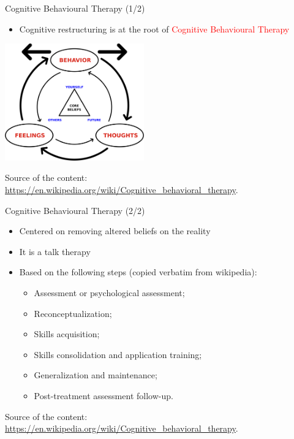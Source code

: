 \documentclass{beamer}
\begin{document}
\begin{frame}
{\centerline{Cognitive Behavioural Therapy (1/2)}}

\begin{itemize}
\item Cognitive restructuring is at the root of \textcolor{red}{Cognitive Behavioural Therapy}
\end{itemize} 

\begin{center}
 \includegraphics[width=6cm]{P2023.AIBCCSS.Change/Cognitive_behavioral_therapy.png}
 
 \end{center}
 
 \begin{center}
\tiny
Source of the content: \url{https://en.wikipedia.org/wiki/Cognitive_behavioral_therapy}.
\end{center}


\end{frame}

\begin{frame}
{\centerline{Cognitive Behavioural Therapy (2/2)}}

\begin{itemize}
\item Centered on removing altered beliefs on the reality
\item It is a talk therapy
\item Based on the following steps (copied verbatim from wikipedia):
\begin{itemize}
\item Assessment or psychological assessment;
\item Reconceptualization;
\item Skills acquisition;
\item Skills consolidation and application training;
\item Generalization and maintenance;
\item Post-treatment assessment follow-up.
\end{itemize} 
\end{itemize} 

\begin{center}
\tiny
Source of the content: \url{https://en.wikipedia.org/wiki/Cognitive_behavioral_therapy}.
\end{center}

\end{frame}
\end{document}
